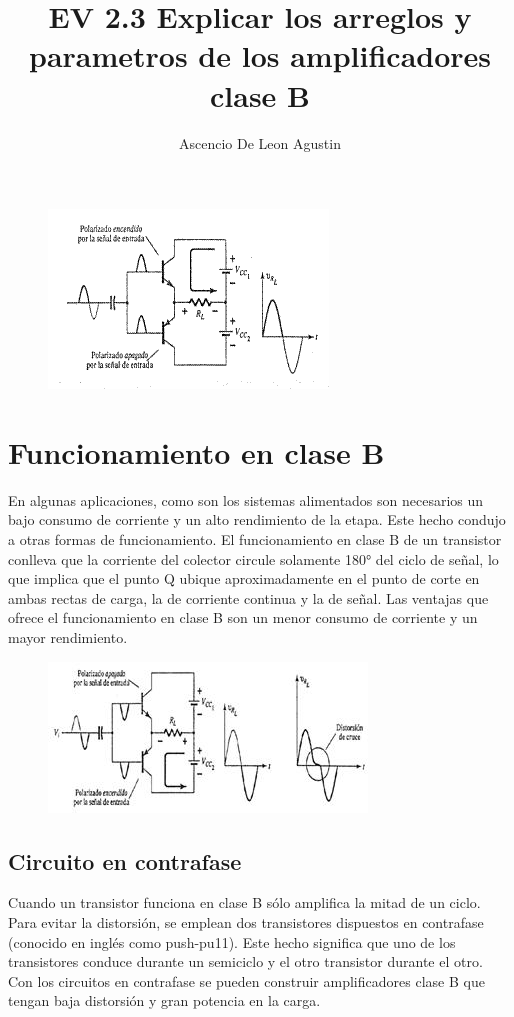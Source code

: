 \documentclass[10pt,letterpaper]{article}
\title{EV 2.3 Explicar los arreglos y parametros de los amplificadores clase B}
\author{Ascencio De Leon Agustin}
\begin{document}
\maketitle
\begin{figure}[h!]
\centering 
\includegraphics[scale=.8]{55}
\end{figure}
\newpage 
\section{Funcionamiento en clase B}
En algunas aplicaciones, como son los sistemas alimentados son necesarios un bajo consumo de corriente y un alto rendimiento de la etapa. Este hecho condujo a otras formas de funcionamiento. El funcionamiento en clase B de un transistor conlleva que la corriente del colector circule solamente 180° del ciclo de señal, lo que implica que el punto Q ubique aproximadamente en el punto de corte en ambas rectas de carga, la de corriente continua y la de señal. Las ventajas que ofrece el funcionamiento en clase B son un menor consumo de corriente y un mayor rendimiento.
\linebreak
\begin{figure}
\includegraphics[scale=.9]{56}
\end{figure}
\linebreak
\subsection{ Circuito en contrafase}
Cuando un transistor funciona en clase B sólo amplifica la mitad de un ciclo. Para evitar la distorsión, se emplean dos transistores dispuestos en contrafase (conocido en inglés como push-pu11). Este hecho significa que uno de los transistores conduce durante un semiciclo y el otro transistor durante el otro. Con los circuitos en contrafase se pueden construir amplificadores clase B que tengan baja distorsión y gran poten­cia en la carga.
\end{document}
